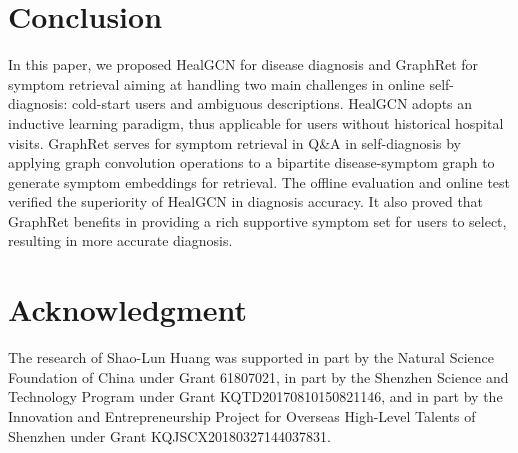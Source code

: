 \documentclass[sigconf]{acmart}
\begin{document}
\section{Conclusion}
In this paper, we proposed HealGCN for disease diagnosis and GraphRet for symptom retrieval aiming at handling two main challenges in online self-diagnosis: cold-start users and ambiguous descriptions. HealGCN adopts an inductive learning paradigm, thus applicable for users without historical hospital visits. GraphRet serves for symptom retrieval in Q\&A in self-diagnosis by applying graph convolution operations to a bipartite disease-symptom graph to generate symptom embeddings for retrieval. The offline evaluation and online test verified the superiority of HealGCN in diagnosis accuracy. It also proved that GraphRet benefits in providing a rich supportive symptom set for users to select, resulting in more accurate diagnosis.
\section*{Acknowledgment}
The research of Shao-Lun Huang was supported in part by the Natural Science Foundation of China under Grant 61807021, in part by the Shenzhen Science and Technology Program under Grant KQTD20170810150821146, and in part by the Innovation and Entrepreneurship Project for Overseas High-Level Talents of Shenzhen under Grant KQJSCX20180327144037831.



\end{document}

